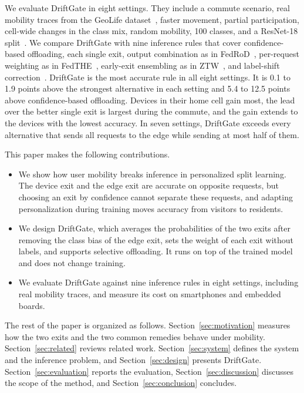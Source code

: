 We evaluate DriftGate in eight settings. They include a commute scenario, real mobility traces from the GeoLife dataset~\cite{zheng2010geolife}, faster movement, partial participation, cell-wide changes in the class mix, random mobility, 100 classes, and a ResNet-18 split~\cite{he2016resnet}. We compare DriftGate with nine inference rules that cover confidence-based offloading, each single exit, output combination as in FedRoD~\cite{chen2022fedrod}, per-request weighting as in FedTHE~\cite{jiang2023fedthe}, early-exit ensembling as in ZTW~\cite{wolczyk2021ztw}, and label-shift correction~\cite{saerens2002adjusting}. DriftGate is the most accurate rule in all eight settings. It is 0.1 to 1.9 points above the strongest alternative in each setting and 5.4 to 12.5 points above confidence-based offloading. Devices in their home cell gain most, the lead over the better single exit is largest during the commute, and the gain extends to the devices with the lowest accuracy. In seven settings, DriftGate exceeds every alternative that sends all requests to the edge while sending at most half of them. 

This paper makes the following contributions.
\begin{itemize}
    \item We show how user mobility breaks inference in personalized split learning. The device exit and the edge exit are accurate on opposite requests, but choosing an exit by confidence cannot separate these requests, and adapting personalization during training moves accuracy from visitors to residents.
    \item We design DriftGate, which averages the probabilities of the two exits after removing the class bias of the edge exit, sets the weight of each exit without labels, and supports selective offloading. It runs on top of the trained model and does not change training.
    \item We evaluate DriftGate against nine inference rules in eight settings, including real mobility traces, and measure its cost on smartphones and embedded boards.
\end{itemize}

The rest of the paper is organized as follows. Section~\ref{sec:motivation} measures how the two exits and the two common remedies behave under mobility. Section~\ref{sec:related} reviews related work. Section~\ref{sec:system} defines the system and the inference problem, and Section~\ref{sec:design} presents DriftGate. Section~\ref{sec:evaluation} reports the evaluation, Section~\ref{sec:discussion} discusses the scope of the method, and Section~\ref{sec:conclusion} concludes.
